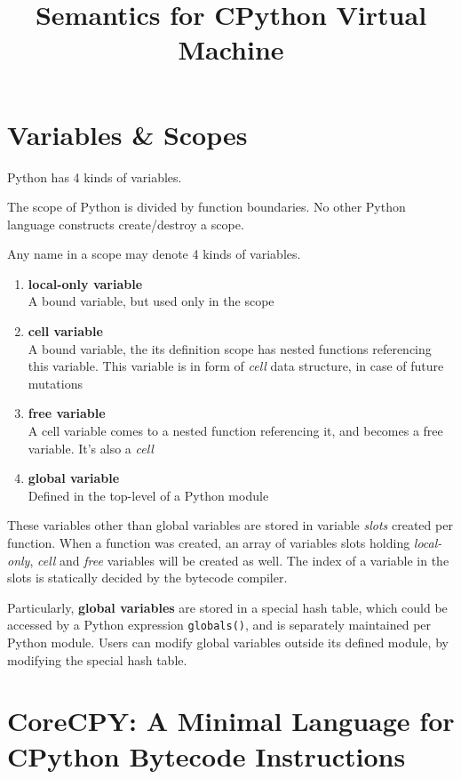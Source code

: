 \documentclass[12pt, a4paper]{report}
\title{Semantics for CPython Virtual Machine}
\begin{document}
\maketitle

\section* {Variables \& Scopes}

Python has 4 kinds of variables.

The scope of Python is divided by function boundaries. No other Python language constructs create/destroy a scope.

Any name in a scope may denote 4 kinds of variables.

\begin{enumerate}
\item \textbf{local-only variable}\mbox{}\\
    A bound variable, but used only in the scope
\item \textbf{cell variable}\mbox{}\\
    A bound variable, the its definition scope has nested functions referencing this variable. This variable is in form of
\textit{cell} data structure, in case of future mutations
\item \textbf{free variable}\mbox{}\\
    A cell variable comes to a nested function referencing it, and becomes a free variable. It's also a \textit{cell}
\item \textbf{global variable}\mbox{}\\
    Defined in the top-level of a Python module
\end{enumerate}

These variables other than global variables are stored in variable \textit{slots} created per function.
When a function was created, an array of variables slots holding \textit{local-only}, \textit{cell} and \textit{free} variables
will be created as well. The index of a variable in the slots is statically decided by the bytecode compiler.

Particularly,  \textbf{global variables} are stored in a special hash table, which could be accessed by a Python expression \lstinline!globals()!,
and is separately maintained per Python module.
Users can modify global variables outside its defined module, by modifying the special hash table.


\section* {\textbf{CoreCPY}: A Minimal Language for CPython Bytecode Instructions}
\end{document}
